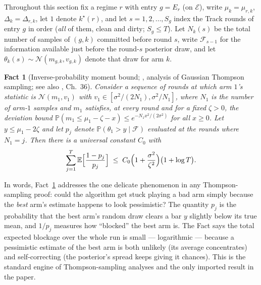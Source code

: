 \documentclass[11pt]{article}
\newtheorem{fact}{Fact}
\newcommand{\Fcal}{\mathcal F}
\newcommand{\Ecal}{\mathcal E}
\newcommand{\E}{\mathbb E}
\newcommand{\Pbb}{\mathbb P}
\begin{document}
Throughout this section fix a regime $r$ with entry $g=E_r$ (on $\Ecal$), write $\mu_k=\mu_{r,k}$, $\Delta_k=\Delta_{r,k}$, let $1$ denote $k^\star(r)$, and let $s=1,2,\ldots,S_g$ index the Track rounds of entry $g$ in order (\emph{all} of them, clean and dirty; $S_g\le T$). Let $N_k(s)$ be the total number of samples of $(g,k)$ committed before round $s$, write $\Fcal_{s-1}$ for the information available just before the round-$s$ posterior draw, and let $\theta_k(s)\sim\mathcal N(m_{g,k},v_{g,k})$ denote that draw for arm $k$.

\begin{fact}[Inverse-probability moment bound; \citealp{AgrawalGoyal2013}, analysis of Gaussian Thompson sampling; see also \citealp{LattimoreSzepesvari2020}, Ch.~36]
\label{fact:invp}
Consider a sequence of rounds at which arm $1$'s statistic is $\mathcal N(m_1,v_1)$ with $v_1\in[\sigma^2/(2N_1),\sigma^2/N_1]$, where $N_1$ is the number of arm-$1$ samples and $m_1$ satisfies, at every round and for a fixed $\zeta>0$, the deviation bound $\Pbb(m_1\le\mu_1-\zeta-x)\le e^{-N_1x^2/(2\sigma^2)}$ for all $x\ge0$. Let $y\le\mu_1-2\zeta$ and let $p_j$ denote $\Pbb(\theta_1>y\mid\Fcal)$ evaluated at the rounds where $N_1=j$. Then there is a universal constant $C_0$ with
\[
\sum_{j=1}^{T}\E\Bigl[\frac{1-p_j}{p_j}\Bigr]
\;\le\;
C_0\Bigl(1+\frac{\sigma^2}{\zeta^2}\Bigr)\bigl(1+\log T\bigr).
\]
\end{fact}

In words, Fact~\ref{fact:invp} addresses the one delicate phenomenon in any Thompson-sampling proof: could the algorithm get stuck playing a bad arm simply because the \emph{best} arm's estimate happens to look pessimistic? The quantity $p_j$ is the probability that the best arm's random draw clears a bar $y$ slightly below its true mean, and $1/p_j$ measures how ``blocked'' the best arm is. The Fact says the total expected blockage over the whole run is small --- logarithmic --- because a pessimistic estimate of the best arm is both unlikely (its average concentrates) and self-correcting (the posterior's spread keeps giving it chances). This is the standard engine of Thompson-sampling analyses and the only imported result in the paper.
\end{document}
